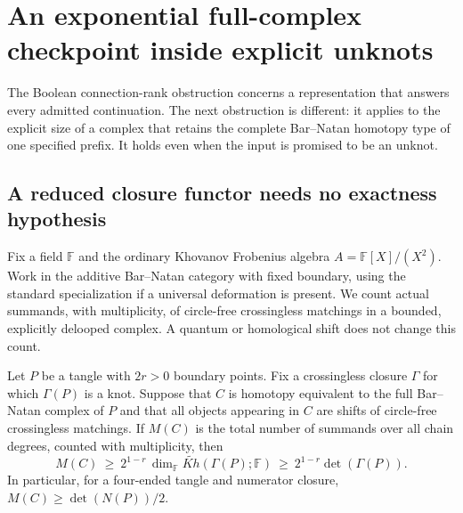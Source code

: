 
\section{An exponential full-complex checkpoint inside explicit unknots}
\label{sec:unknot-checkpoint-lower-bound}

The Boolean connection-rank obstruction concerns a representation that
answers every admitted continuation.  The next obstruction is different:
it applies to the explicit size of a complex that retains the complete
Bar--Natan homotopy type of one specified prefix.  It holds even when the
input is promised to be an unknot.

\subsection{A reduced closure functor needs no exactness hypothesis}

Fix a field $\mathbb F$ and the ordinary Khovanov Frobenius algebra
$A=\mathbb F[X]/(X^2)$.  Work in the additive Bar--Natan category with
fixed boundary, using the standard specialization if a universal
deformation is present.  We count actual summands, with multiplicity,
of circle-free crossingless matchings in a bounded, explicitly delooped
complex.  A quantum or homological shift does not change this count.

\begin{lemma}
\label{lem:reduced-closure-size}
Let $P$ be a tangle with $2r>0$ boundary points.  Fix a crossingless
closure $\Gamma$ for which $\Gamma(P)$ is a knot.  Suppose that $C$ is
homotopy equivalent to the full Bar--Natan complex of $P$ and that all
objects appearing in $C$ are shifts of circle-free crossingless
matchings.  If $M(C)$ is the total number of summands over all chain
degrees, counted with multiplicity, then
\[
 M(C)\ \ge\ 2^{1-r}\,
 \dim_{\mathbb F}\widetilde{Kh}(\Gamma(P);\mathbb F)
 \ \ge\ 2^{1-r}\det(\Gamma(P)).
\]
In particular, for a four-ended tangle and numerator closure,
$M(C)\ge \det(N(P))/2$.
\end{lemma}


